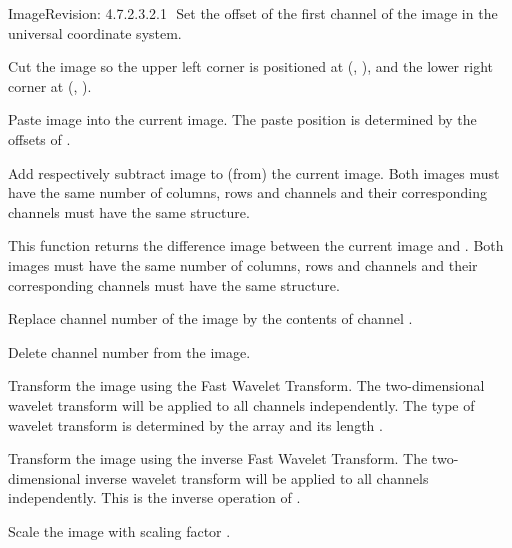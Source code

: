 \begin{manpage}{\libtitle}{Image}{$ $Revision: 4.7.2.3.2.1 $ $}
    Set the offset of the first channel of the image in the universal
    coordinate system.

    Cut the image so the upper left corner is positioned at
    (, ), and the lower right corner at (,
    ).

    Paste image  into the current image. The paste position is
    determined by the offsets of .

    Add respectively subtract image  to (from) the current image. Both
    images must have the same number of columns, rows and channels and their
    corresponding channels must have the same structure.

    This function returns the difference image between the current image and
    . Both images must have the same number of columns, rows and
    channels and their corresponding channels must have the same structure.

    Replace channel number  of the image by the contents of channel
    .

    Delete channel number  from the image.

    Transform the image using the Fast Wavelet Transform. The two-dimensional
    wavelet transform will be applied to all channels independently. The type
    of wavelet transform is determined by the  array and its
    length .

    Transform the image using the inverse Fast Wavelet Transform. The
    two-dimensional inverse wavelet transform will be applied to all channels
    independently.  This is the inverse operation of .

    Scale the image with scaling factor .



\end{manpage}
